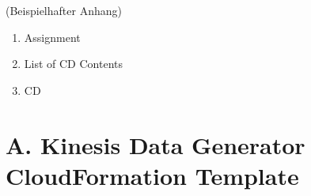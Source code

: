 
\addchap{\langanhang}

(Beispielhafter Anhang)
 

{\Large
\begin{enumerate}[label=\Alph*.]
	\item Assignment
	\item List of CD Contents
	\item CD 
\end{enumerate}
}
\pagebreak
\pagebreak
\section*{A. Kinesis Data Generator CloudFormation Template}\label{app:KDG}

